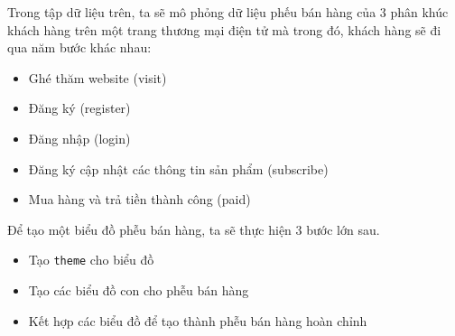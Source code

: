 \documentclass[]{krantz}
\providecommand{\tightlist}{%
  \setlength{\itemsep}{0pt}\setlength{\parskip}{0pt}}
\theoremstyle{definition}
\theoremstyle{definition}
\theoremstyle{definition}
\theoremstyle{remark}
\begin{document}
Trong tập dữ liệu trên, ta sẽ mô phỏng dữ liệu phếu bán hàng của 3 phân
khúc khách hàng trên một trang thương mại điện tử mà trong đó, khách
hàng sẽ đi qua năm bước khác nhau:

\begin{itemize}
\tightlist
\item
  Ghé thăm website (visit)
\item
  Đăng ký (register)
\item
  Đăng nhập (login)
\item
  Đăng ký cập nhật các thông tin sản phẩm (subscribe)
\item
  Mua hàng và trả tiền thành công (paid)
\end{itemize}

Để tạo một biểu đồ phễu bán hàng, ta sẽ thực hiện 3 bước lớn sau.

\begin{itemize}
\tightlist
\item
  Tạo \texttt{theme} cho biểu đồ
\item
  Tạo các biểu đồ con cho phễu bán hàng
\item
  Kết hợp các biểu đồ để tạo thành phễu bán hàng hoàn chỉnh
\end{itemize}
\end{document}
